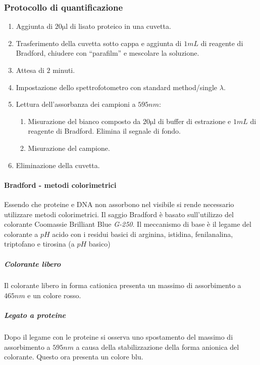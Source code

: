 		\subsubsection{Protocollo di quantificazione}
		\begin{enumerate}
			\item Aggiunta di $20\si{\micro\litre}$ di lisato proteico in una cuvetta.
			\item Trasferimento della cuvetta sotto cappa e aggiunta di $1\si{mL}$ di reagente di Bradford, chiudere con ``parafilm'' e mescolare la soluzione.
			\item Attesa di $2$ minuti.
			\item Impostazione dello spettrofotometro con standard method/single $\lambda$.
			\item Lettura dell'assorbanza dei campioni a $595\si{nm}$:
				\begin{enumerate}
					\item Misurazione del bianco composto da $20\si{\micro\litre}$ di buffer di estrazione e $1\si{mL}$ di reagente di Bradford.
						Elimina il segnale di fondo.
					\item Misurazione del campione.
				\end{enumerate}
			\item Eliminazione della cuvetta.
		\end{enumerate}

			\paragraph{Bradford - metodi colorimetrici}
			Essendo che proteine e DNA non assorbono nel visibile si rende necessario utilizzare metodi colorimetrici.
			Il saggio Bradford \`e basato sull'utilizzo del colorante Coomassie Brilliant Blue \emph{G-250}. 
			Il meccanismo di base \`e il legame del colorante a $pH$ acido con i residui basici di arginina, istidina, fenilanalina, triptofano e tirosina (a $pH$ basico)
				
				\subparagraph{Colorante libero}
				Il colorante libero in forma cationica presenta un massimo di assorbimento a $465\si{nm}$ e un colore rosso.
				
				\subparagraph{Legato a proteine}
				Dopo il legame con le proteine si osserva uno spostamento del massimo di assorbimento a $595\si{nm}$ a causa della stabilizzazione della forma anionica del colorante.
				Questo ora presenta un colore blu.

